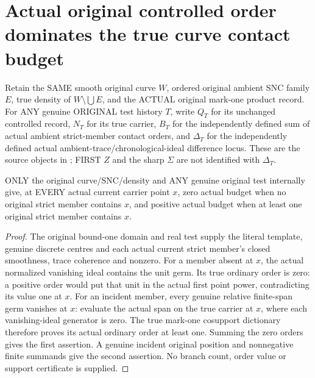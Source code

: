 \section{Actual original controlled order dominates the true curve contact budget}

Retain the SAME smooth original curve $W$, ordered original ambient SNC
family $E$, true density of $W\setminus\bigcup E$, and the ACTUAL original
mark-one product record. For ANY genuine ORIGINAL test history $T$, write
$Q_T$ for its unchanged controlled record, $N_T$ for its true carrier,
$B_T$ for the independently defined sum of actual ambient strict-member
contact orders, and $\Delta_T$ for the independently defined actual
ambient-trace/chronological-ideal difference locus. These are the source
objects in \cite[\S12]{bierstone-milman97-invent-math}; FIRST $Z$ and the
sharp $\Sigma$ are not identified with $\Delta_T$.

\begin{lemma}
\label{hir:sharp-original-curve-budget-incidence-positivity}
\leanok
ONLY the original curve/SNC/density and ANY genuine original test internally
give, at EVERY actual current carrier point $x$, zero actual budget when
no original strict member contains $x$, and positive actual budget when
at least one original strict member contains $x$.
\end{lemma}
\begin{proof}
The original bound-one domain and real test supply the literal template,
genuine discrete centres and each actual current strict member's closed
smoothness, trace coherence and nonzero. For a member absent at $x$, the
actual normalized vanishing ideal contains the unit germ. Its true
ordinary order is zero: a positive order would put that unit in the
actual first point power, contradicting its value one at $x$.
For an incident member, every genuine relative finite-span germ vanishes
at $x$: evaluate the actual span on the true carrier at $x$, where each
vanishing-ideal generator is zero. The true mark-one cosupport dictionary
therefore proves its actual ordinary order at least one. Summing the zero
orders gives the first assertion. A genuine incident original position
and nonnegative finite summands give the second assertion. No branch
count, order value or support certificate is supplied.
\end{proof}


